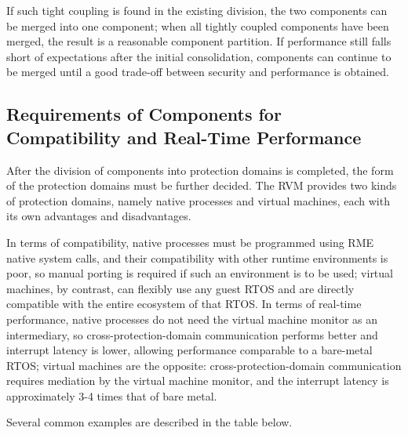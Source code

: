 If such tight coupling is found in the existing division, the two components can be merged into one component; when all tightly coupled components have been merged, the result is a reasonable component partition. If performance still falls short of expectations after the initial consolidation, components can continue to be merged until a good trade-off between security and performance is obtained.

\subsection{Requirements of Components for Compatibility and Real-Time Performance}\label{subsec:6-2-2}

After the division of components into protection domains is completed, the form of the protection domains must be further decided. The RVM provides two kinds of protection domains, namely native processes and virtual machines, each with its own advantages and disadvantages.

In terms of compatibility, native processes must be programmed using RME native system calls, and their compatibility with other runtime environments is poor, so manual porting is required if such an environment is to be used; virtual machines, by contrast, can flexibly use any guest RTOS and are directly compatible with the entire ecosystem of that RTOS. In terms of real-time performance, native processes do not need the virtual machine monitor as an intermediary, so cross-protection-domain communication performs better and interrupt latency is lower, allowing performance comparable to a bare-metal RTOS; virtual machines are the opposite: cross-protection-domain communication requires mediation by the virtual machine monitor, and the interrupt latency is approximately 3-4 times that of bare metal.

Several common examples are described in the table below.

